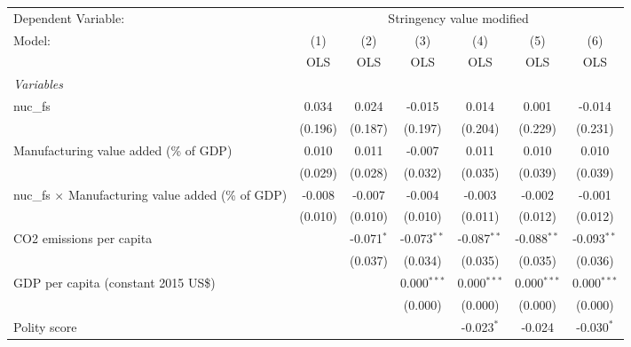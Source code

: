 
\begingroup
\centering
\begin{tabular}{lcccccc}
   \toprule
   Dependent Variable: & \multicolumn{6}{c}{Stringency value modified}\\
   Model:                                                    & (1)     & (2)          & (3)           & (4)           & (5)           & (6)\\  
                                                             &  OLS    & OLS          & OLS           & OLS           & OLS           & OLS\\  
   \midrule
   \emph{Variables}\\
   nuc\_fs                                                   & 0.034   & 0.024        & -0.015        & 0.014         & 0.001         & -0.014\\   
                                                             & (0.196) & (0.187)      & (0.197)       & (0.204)       & (0.229)       & (0.231)\\   
   Manufacturing value added (\% of GDP)                     & 0.010   & 0.011        & -0.007        & 0.011         & 0.010         & 0.010\\   
                                                             & (0.029) & (0.028)      & (0.032)       & (0.035)       & (0.039)       & (0.039)\\   
   nuc\_fs $\times$ Manufacturing value added (\% of GDP)    & -0.008  & -0.007       & -0.004        & -0.003        & -0.002        & -0.001\\   
                                                             & (0.010) & (0.010)      & (0.010)       & (0.011)       & (0.012)       & (0.012)\\   
   CO2 emissions per capita                                  &         & -0.071$^{*}$ & -0.073$^{**}$ & -0.087$^{**}$ & -0.088$^{**}$ & -0.093$^{**}$\\   
                                                             &         & (0.037)      & (0.034)       & (0.035)       & (0.035)       & (0.036)\\   
   GDP per capita (constant 2015 US\$)                       &         &              & 0.000$^{***}$ & 0.000$^{***}$ & 0.000$^{***}$ & 0.000$^{***}$\\   
                                                             &         &              & (0.000)       & (0.000)       & (0.000)       & (0.000)\\   
   Polity score                                              &         &              &               & -0.023$^{*}$  & -0.024        & -0.030$^{*}$\\   

\end{tabular}
